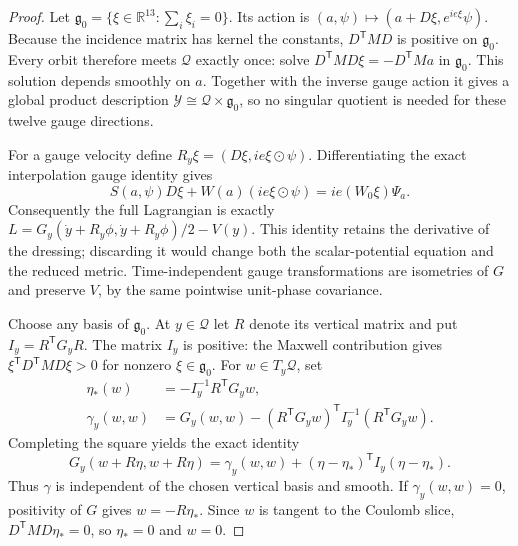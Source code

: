 \begin{proof}
Let \(\mathfrak g_0=\{\xi\in\mathbb R^{13}:\sum_i\xi_i=0\}\).
Its action is \((a,\psi)\mapsto(a+D\xi,e^{ie\xi}\psi)\).
Because the incidence matrix has kernel the constants,
\(D^{\mathsf T}MD\) is positive on \(\mathfrak g_0\).
Every orbit therefore meets \(\mathcal Q\) exactly once: solve
\(D^{\mathsf T}MD\xi=-D^{\mathsf T}Ma\) in
\(\mathfrak g_0\). This solution depends smoothly on \(a\).
Together with the inverse gauge action it gives a global product
description \(\mathcal Y\cong\mathcal Q\times\mathfrak g_0\),
so no singular quotient is needed for these twelve gauge directions.

For a gauge velocity define
\(R_y\xi=(D\xi,ie\xi\mathbin{\odot}\psi)\).
Differentiating the exact interpolation gauge identity gives
\begin{equation}
 S(a,\psi)D\xi+W(a)(ie\xi\mathbin{\odot}\psi)
                 =ie(W_0\xi)\Psi_a.
 \label{eq:whitney-interacting-vertical-identity}
\end{equation}
Consequently the full Lagrangian is exactly
\(L=G_y(\dot y+R_y\phi,\dot y+R_y\phi)/2-V(y)\).
This identity retains the derivative of the dressing; discarding it
would change both the scalar-potential equation and the reduced metric.
Time-independent gauge transformations are isometries of \(G\) and
preserve \(V\), by the same pointwise unit-phase covariance.

Choose any basis of \(\mathfrak g_0\). At \(y\in\mathcal Q\)
let \(R\) denote its vertical matrix and put
\(I_y=R^{\mathsf T}G_yR\). The matrix \(I_y\) is positive:
the Maxwell contribution gives
\(\xi^{\mathsf T}D^{\mathsf T}MD\xi>0\) for nonzero
\(\xi\in\mathfrak g_0\).
For \(w\in T_y\mathcal Q\), set
\begin{align*}
 \eta_*(w)&=-I_y^{-1}R^{\mathsf T}G_yw,\\
 \gamma_y(w,w)&=G_y(w,w)-
 (R^{\mathsf T}G_yw)^{\mathsf T}I_y^{-1}(R^{\mathsf T}G_yw).
\end{align*}
Completing the square yields the exact identity
\[
 G_y(w+R\eta,w+R\eta)
 =\gamma_y(w,w)+(\eta-\eta_*)^{\mathsf T}I_y(\eta-\eta_*).
\]
Thus \(\gamma\) is independent of the chosen vertical basis and
smooth. If \(\gamma_y(w,w)=0\), positivity of \(G\) gives
\(w=-R\eta_*\). Since \(w\) is tangent to the Coulomb slice,
\(D^{\mathsf T}MD\eta_*=0\), so \(\eta_*=0\) and
\(w=0\).


\end{proof}
